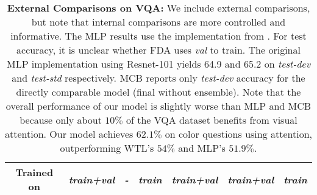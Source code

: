 \begin{table}[]
{\begin{tabular}{|c|c|c|c|c|c|c|}
Trained on                                                                        & \textit{train+val}          & \textit{-} & \textit{train}  & \textit{train+val}    & \textit{train+val} & \textit{train}  \\\hline 
\end{tabular}}
\vspace{-2mm}
\caption{\textbf{External Comparisons on VQA:} We include external comparisons, but note that internal comparisons are more controlled and informative.  The MLP results use the implementation from \cite{mallya2016simplevqa}. For test accuracy, it is unclear whether FDA uses \textit{val} to train. The original MLP implementation \cite{jabri2016revisiting} using Resnet-101 yields 64.9 and 65.2 on \textit{test-dev} and \textit{test-std} respectively. MCB reports only \textit{test-dev} accuracy for the directly comparable model (final without ensemble). Note that the overall performance of our model is slightly worse than MLP and MCB because only about $10\%$ of the VQA dataset benefits from visual attention. Our model achieves $62.1\%$ on color questions using attention, outperforming WTL's $54\%$ and MLP's $51.9\%$.}
\label{tab:state_art}
\end{table}

%
